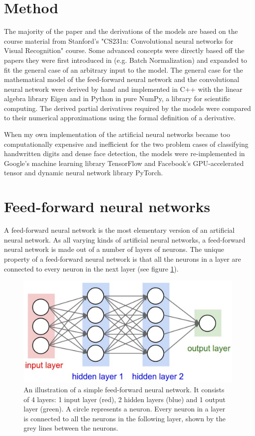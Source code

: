 \documentclass[a4paper, twoside]{article}
\begin{document}
\section{Method}
The majority of the paper and the derivations of the models are based on the course material from Stanford's "CS231n: Convolutional neural networks for Visual Recognition" course. Some advanced concepts were directly based off the papers they were first introduced in (e.g. Batch Normalization) and expanded to fit the general case of an arbitrary input to the model. The general case for the mathematical model of the feed-forward neural network and the convolutional neural network were derived by hand and implemented in C++ with the linear algebra library Eigen and in Python in pure NumPy, a library for scientific computing. The derived partial derivatives required by the models were compared to their numerical approximations using the formal definition of a derivative. \cite{cs231n} \cite{batchnorm} \cite{eigen} \cite{numpy}

When my own implementation of the artificial neural networks became too computationally expensive and inefficient for the two problem cases of classifying handwritten digits and dense face detection, the models were re-implemented in Google's machine learning library TensorFlow and Facebook's GPU-accelerated tensor and dynamic neural network library PyTorch. \cite{tensorflow} \cite{pytorch}

\section{Feed-forward neural networks}
A feed-forward neural network is the most elementary version of an artificial neural network. As all varying kinds of artificial neural networks, a feed-forward neural network is made out of a number of layers of neurons. The unique property of a feed-forward neural network is that all the neurons in a layer are connected to every neuron in the next layer (see figure \ref{figfeedforward}). \cite{cs231n}

\begin{figure}[h]
	\centering
  		\includegraphics[scale=1]{feedforward.png}
  	\caption{An illustration of a simple feed-forward neural network. It consists of 4 layers: 1 input layer (red), 2 hidden layers (blue) and 1 output layer (green). A circle represents a neuron. Every neuron in a layer is connected to all the neurons in the following layer, shown by the grey lines between the neurons. \cite{hidden12}} \label{figfeedforward}
\end{figure}
\end{document}
